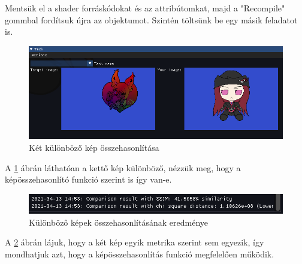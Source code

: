 Mentsük el a shader forráskódokat és az attribútomkat, majd a "Recompile" gommbal fordítsuk újra az objektumot. Szintén töltsünk be egy másik feladatot is.


\begin{figure}[hbt!]
    \centering
    \includegraphics[width=\textwidth,height=\textheight,keepaspectratio]
    {resources/Showcase/slimshady_badComparison.png}
    \caption{Két különböző kép összehasonlítása}
    \label{fig:badcomparison}
\end{figure}

A \ref{fig:badcomparison} ábrán láthatóan a kettő kép különböző, nézzük meg, hogy a képösszehasonlító funkció szerint is így van-e.

\begin{figure}[hbt!]
    \centering
    \includegraphics[width=\textwidth,height=\textheight,keepaspectratio]
    {resources/Showcase/slimshady_badComparisonResult.png}
    \caption{Különböző képek összehasonlításának eredménye}
    \label{fig:badcomparisonresult}
\end{figure}

A \ref{fig:badcomparisonresult} ábrán lájuk, hogy a két kép egyik metrika szerint sem egyezik, így mondhatjuk azt, hogy a képösszehasonlítás funkció megfelelően működik.

